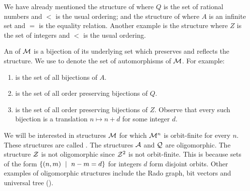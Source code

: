 \documentclass[a4paper,11pt]{article}
\begin{document}
We have already mentioned the structure of  where $Q$ is the set of rational numbers and $<$ is the usual ordering;
and the structure of  where $A$ is an infinite set and $=$ is the equality relation.
Another example is the structure  where $Z$ is the set of integers and $<$ is the usual ordering.

An  of $\mathcal{M}$ is a bijection of its underlying set which preserves and reflects the structure.
We use \emphdef{$\aut{\M}$} to denote the set of automorphisms of $\mathcal{M}$.
For example:
\begin{enumerate}
  \item \emphdef{$\aut{\A}$} is the set of all bijections of $A$.
  \item \emphdef{$\aut{\dloQ}$} is the set of all order preserving bijections of $Q$.
  \item \emphdef{$\aut{\ordZ}$} is the set of all order preserving bijections of $Z$. Observe that every such bijection is a translation $n \mapsto n + d$ for some integer $d$.
\end{enumerate}
%
%
We will be interested in structures $\mathcal{M}$ for which $\mathcal{M}^n$ is orbit-finite for every $n$.
These structures are called .
The structures $\mathcal{A}$ and $\mathcal{Q}$ are oligomorphic.
The structure $\mathcal{Z}$ is not oligomorphic since $\mathcal{Z}^2$ is not orbit-finite.
This is because sets of the form $\left\{(n,m)\ \mid\ n-m=d \right\}$ for integers $d$ form disjoint orbits.
Other examples of oligomorphic structures include the Rado graph, bit vectors and universal tree (\cite[Section 7]{atombook}).
\end{document}
